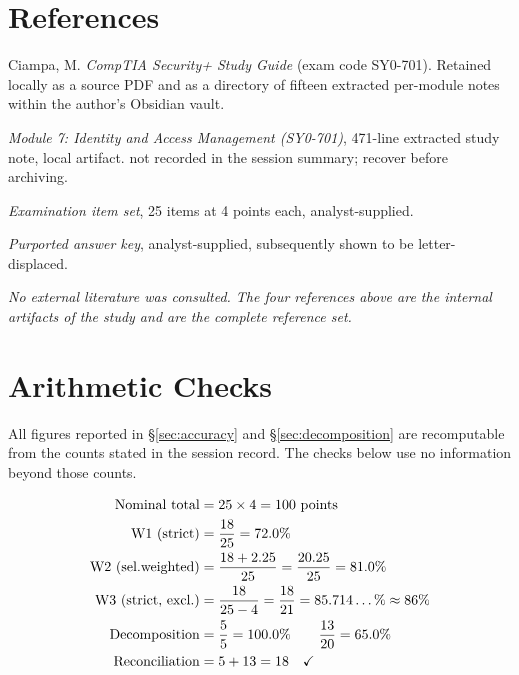 \documentclass[11pt]{article}
\newcommand{\pct}{\%}
\begin{document}
\section*{References}
\small
\begin{enumerate}[label={[\arabic*]}]
\item Ciampa, M. \emph{CompTIA Security+ Study Guide} (exam code SY0-701).
      Retained locally as a source PDF and as a directory of fifteen
      extracted per-module notes within the author's Obsidian vault.
\item \emph{Module 7: Identity and Access Management (SY0-701)}, 471-line
      extracted study note, local artifact. %
      not recorded in the session summary; recover before archiving.
\item \emph{Examination item set}, 25 items at 4 points each, analyst-supplied.
\item \emph{Purported answer key}, analyst-supplied, subsequently shown to be
      letter-displaced. %
\end{enumerate}
\normalsize

\noindent\emph{No external literature was consulted. The four references above
are the internal artifacts of the study and are the complete reference set.}

\appendix
\section{Arithmetic Checks}
\label{sec:appendix}

All figures reported in \S\ref{sec:accuracy} and \S\ref{sec:decomposition}
are recomputable from the counts stated in the session record. The checks
below use no information beyond those counts.

\begin{align*}
\text{Nominal total}       &= 25 \times 4 = 100 \text{ points} \\
\text{W1 (strict)}        &= \frac{18}{25} = 72.0\pct \\
\text{W2 (sel.\-weighted)}&= \frac{18 + 2.25}{25} = \frac{20.25}{25} = 81.0\pct \\
\text{W3 (strict, excl.)} &= \frac{18}{25-4} = \frac{18}{21} = 85.714\ldots\pct \approx 86\pct \\
\text{Decomposition}      &= \frac{5}{5} = 100.0\pct \qquad \frac{13}{20} = 65.0\pct \\
\text{Reconciliation}     &= 5 + 13 = 18 \quad\checkmark
\end{align*}
\end{document}
